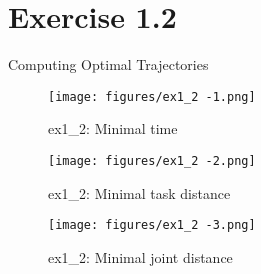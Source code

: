 \section*{Exercise 1.2}
Computing Optimal Trajectories

\begin{figure*}[htbp]
    \centering
    \texttt{[image: figures/ex1\_2 -1.png]}
    \caption{ex1\_2: Minimal time}
\end{figure*}

\begin{figure*}[htbp]
    \centering
    \texttt{[image: figures/ex1\_2 -2.png]}
    \caption{ex1\_2: Minimal task distance}
\end{figure*}

\begin{figure*}[htbp]
    \centering
    \texttt{[image: figures/ex1\_2 -3.png]}
    \caption{ex1\_2: Minimal joint distance}
\end{figure*}
